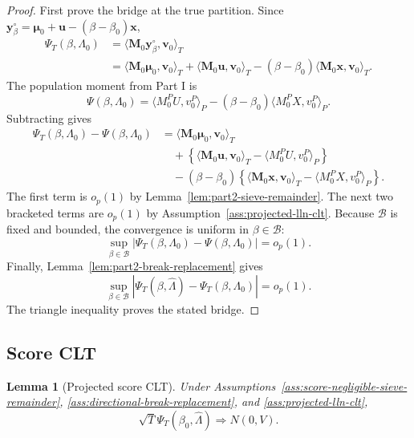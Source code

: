 \documentclass[12pt]{article}
\numberwithin{equation}{section}
\newtheorem{lemma}{Lemma}
\theoremstyle{definition}
\newcommand{\op}{o_p}
\newcommand{\innerT}[2]{\langle #1,#2\rangle_T}
\newcommand{\innerP}[2]{\langle #1,#2\rangle_P}
\begin{document}
\begin{proof}
First prove the bridge at the true partition. Since
\(\bm y_\beta^\circ=\bm\mu_0+\bm u-(\beta-\beta_0)\bm x\),
\[
\begin{aligned}
    \Psi_T(\beta,\Lambda_0)
    &=\innerT{\bm M_0\bm y_\beta^\circ}{\bm v_0} \\
    &=\innerT{\bm M_0\bm\mu_0}{\bm v_0}
      +\innerT{\bm M_0\bm u}{\bm v_0}
      -(\beta-\beta_0)\innerT{\bm M_0\bm x}{\bm v_0}.
\end{aligned}
\]
The population moment from Part I is
\[
    \Psi(\beta,\Lambda_0)
    =\innerP{M_0^PU}{v_0^P}
     -(\beta-\beta_0)\innerP{M_0^PX}{v_0^P}.
\]
Subtracting gives
\[
\begin{aligned}
    \Psi_T(\beta,\Lambda_0)-\Psi(\beta,\Lambda_0)
    &=\innerT{\bm M_0\bm\mu_0}{\bm v_0} \\
    &\quad+
      \left\{\innerT{\bm M_0\bm u}{\bm v_0}
      -\innerP{M_0^PU}{v_0^P}\right\} \\
    &\quad-(\beta-\beta_0)
      \left\{\innerT{\bm M_0\bm x}{\bm v_0}
      -\innerP{M_0^PX}{v_0^P}\right\}.
\end{aligned}
\]
The first term is \(\op(1)\) by Lemma~\ref{lem:part2-sieve-remainder}. The next
two bracketed terms are \(\op(1)\) by Assumption~\ref{ass:projected-lln-clt}.
Because \(\mathcal B\) is fixed and bounded, the convergence is uniform in
\(\beta\in\mathcal B\):
\[
    \sup_{\beta\in\mathcal B}
    |\Psi_T(\beta,\Lambda_0)-\Psi(\beta,\Lambda_0)|=\op(1).
\]
Finally, Lemma~\ref{lem:part2-break-replacement} gives
\[
    \sup_{\beta\in\mathcal B}
    |\Psi_T(\beta,\widehat\Lambda)-\Psi_T(\beta,\Lambda_0)|=\op(1).
\]
The triangle inequality proves the stated bridge.
\end{proof}

\subsection{Score CLT}

\begin{lemma}[Projected score CLT]
\label{lem:part2-score-clt}
Under Assumptions~\ref{ass:score-negligible-sieve-remainder},
\ref{ass:directional-break-replacement}, and \ref{ass:projected-lln-clt},
\[
    \sqrt T\Psi_T(\beta_0,\widehat\Lambda)
    \Rightarrow N(0,V).
\]
\end{lemma}
\end{document}
